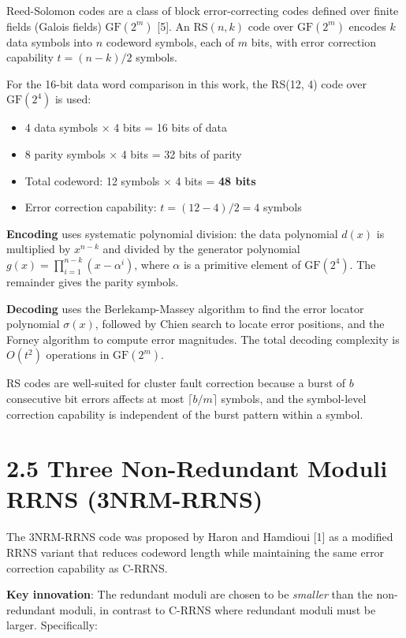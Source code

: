\documentclass[
  english,
  12pt,
]{report}
\providecommand{\tightlist}{%
  \setlength{\itemsep}{0pt}\setlength{\parskip}{0pt}}
\begin{document}
Reed-Solomon codes are a class of block error-correcting codes defined
over finite fields (Galois fields) \(\text{GF}(2^m)\) {[}5{]}. An
RS\((n, k)\) code over \(\text{GF}(2^m)\) encodes \(k\) data symbols
into \(n\) codeword symbols, each of \(m\) bits, with error correction
capability \(t = (n-k)/2\) symbols.

For the 16-bit data word comparison in this work, the RS(12, 4) code
over \(\text{GF}(2^4)\) is used:

\begin{itemize}
\tightlist
\item
  4 data symbols × 4 bits = 16 bits of data
\item
  8 parity symbols × 4 bits = 32 bits of parity
\item
  Total codeword: 12 symbols × 4 bits = \textbf{48 bits}
\item
  Error correction capability: \(t = (12-4)/2 = 4\) symbols
\end{itemize}

\textbf{Encoding} uses systematic polynomial division: the data
polynomial \(d(x)\) is multiplied by \(x^{n-k}\) and divided by the
generator polynomial \(g(x) = \prod_{i=1}^{n-k}(x - \alpha^i)\), where
\(\alpha\) is a primitive element of \(\text{GF}(2^4)\). The remainder
gives the parity symbols.

\textbf{Decoding} uses the Berlekamp-Massey algorithm to find the error
locator polynomial \(\sigma(x)\), followed by Chien search to locate
error positions, and the Forney algorithm to compute error magnitudes.
The total decoding complexity is \(O(t^2)\) operations in
\(\text{GF}(2^m)\).

RS codes are well-suited for cluster fault correction because a burst of
\(b\) consecutive bit errors affects at most \(\lceil b/m \rceil\)
symbols, and the symbol-level correction capability is independent of
the burst pattern within a symbol.

\section{2.5 Three Non-Redundant Moduli RRNS
(3NRM-RRNS)}\label{three-non-redundant-moduli-rrns-3nrm-rrns}

The 3NRM-RRNS code was proposed by Haron and Hamdioui {[}1{]} as a
modified RRNS variant that reduces codeword length while maintaining the
same error correction capability as C-RRNS.

\textbf{Key innovation}: The redundant moduli are chosen to be
\emph{smaller} than the non-redundant moduli, in contrast to C-RRNS
where redundant moduli must be larger. Specifically:
\end{document}
